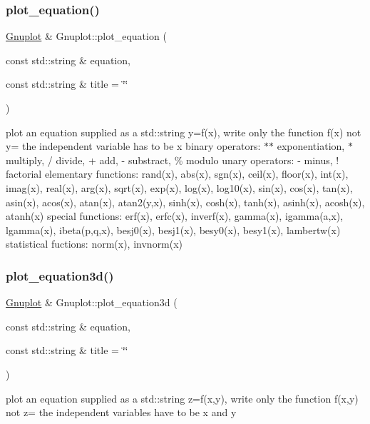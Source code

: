 \subsubsection{\texorpdfstring{plot\+\_\+equation()}{plot\_equation()}}
{\footnotesize\ttfamily \hyperlink{classGnuplot}{Gnuplot} \& Gnuplot\+::plot\+\_\+equation (\begin{DoxyParamCaption}\item[{const std\+::string \&}]{equation,  }\item[{const std\+::string \&}]{title = {\ttfamily \char`\"{}\char`\"{}} }\end{DoxyParamCaption})}

plot an equation supplied as a std\+::string y=f(x), write only the function f(x) not y= the independent variable has to be x binary operators\+: $\ast$$\ast$ exponentiation, $\ast$ multiply, / divide, + add, -\/ substract, \% modulo unary operators\+: -\/ minus, ! factorial elementary functions\+: rand(x), abs(x), sgn(x), ceil(x), floor(x), int(x), imag(x), real(x), arg(x), sqrt(x), exp(x), log(x), log10(x), sin(x), cos(x), tan(x), asin(x), acos(x), atan(x), atan2(y,x), sinh(x), cosh(x), tanh(x), asinh(x), acosh(x), atanh(x) special functions\+: erf(x), erfc(x), inverf(x), gamma(x), igamma(a,x), lgamma(x), ibeta(p,q,x), besj0(x), besj1(x), besy0(x), besy1(x), lambertw(x) statistical fuctions\+: norm(x), invnorm(x) \mbox{\label{classGnuplot_a79aed3a6927f7d1d3497cba441e8a943}} 
\subsubsection{\texorpdfstring{plot\+\_\+equation3d()}{plot\_equation3d()}}
{\footnotesize\ttfamily \hyperlink{classGnuplot}{Gnuplot} \& Gnuplot\+::plot\+\_\+equation3d (\begin{DoxyParamCaption}\item[{const std\+::string \&}]{equation,  }\item[{const std\+::string \&}]{title = {\ttfamily \char`\"{}\char`\"{}} }\end{DoxyParamCaption})}

plot an equation supplied as a std\+::string z=f(x,y), write only the function f(x,y) not z= the independent variables have to be x and y \mbox{\label{classGnuplot_aae22c0470a6fbbc1f5e84dec8d023381}} 
